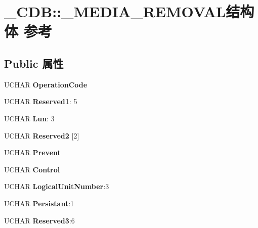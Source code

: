 \hypertarget{struct___c_d_b_1_1___m_e_d_i_a___r_e_m_o_v_a_l}{}\section{\+\_\+\+C\+DB\+:\+:\+\_\+\+M\+E\+D\+I\+A\+\_\+\+R\+E\+M\+O\+V\+A\+L结构体 参考}
\label{struct___c_d_b_1_1___m_e_d_i_a___r_e_m_o_v_a_l}
\subsection*{Public 属性}
\begin{DoxyCompactItemize}
\item 
\mbox{\label{struct___c_d_b_1_1___m_e_d_i_a___r_e_m_o_v_a_l_a3e7841f74c0654f3897bc0acdd3f5c9a}} 
U\+C\+H\+AR {\bfseries Operation\+Code}
\item 
\mbox{\label{struct___c_d_b_1_1___m_e_d_i_a___r_e_m_o_v_a_l_a9e17a1b302214954d49114c99cef1595}} 
U\+C\+H\+AR {\bfseries Reserved1}\+: 5
\item 
\mbox{\label{struct___c_d_b_1_1___m_e_d_i_a___r_e_m_o_v_a_l_a91f079bcffb6fa08b2c122dba74b6a2d}} 
U\+C\+H\+AR {\bfseries Lun}\+: 3
\item 
\mbox{\label{struct___c_d_b_1_1___m_e_d_i_a___r_e_m_o_v_a_l_a0e8a9ac20af4bbc0ef28c388fb24526f}} 
U\+C\+H\+AR {\bfseries Reserved2} \mbox{[}2\mbox{]}
\item 
\mbox{\label{struct___c_d_b_1_1___m_e_d_i_a___r_e_m_o_v_a_l_a3eb3f7346401fada71a5b485f2ce3e8c}} 
U\+C\+H\+AR {\bfseries Prevent}
\item 
\mbox{\label{struct___c_d_b_1_1___m_e_d_i_a___r_e_m_o_v_a_l_ad927ca5b2d00dd9ffbca91e656daa80b}} 
U\+C\+H\+AR {\bfseries Control}
\item 
\mbox{\label{struct___c_d_b_1_1___m_e_d_i_a___r_e_m_o_v_a_l_a4cfd3d95207e4f6030e395be4e1e36d5}} 
U\+C\+H\+AR {\bfseries Logical\+Unit\+Number}\+:3
\item 
\mbox{\label{struct___c_d_b_1_1___m_e_d_i_a___r_e_m_o_v_a_l_aa42958c5f99999b01e74d7d34a4edd18}} 
U\+C\+H\+AR {\bfseries Persistant}\+:1
\item 
\mbox{\label{struct___c_d_b_1_1___m_e_d_i_a___r_e_m_o_v_a_l_aa8ca089f1ad0bff0b369f0f3c9176078}} 
U\+C\+H\+AR {\bfseries Reserved3}\+:6
\end{DoxyCompactItemize}


